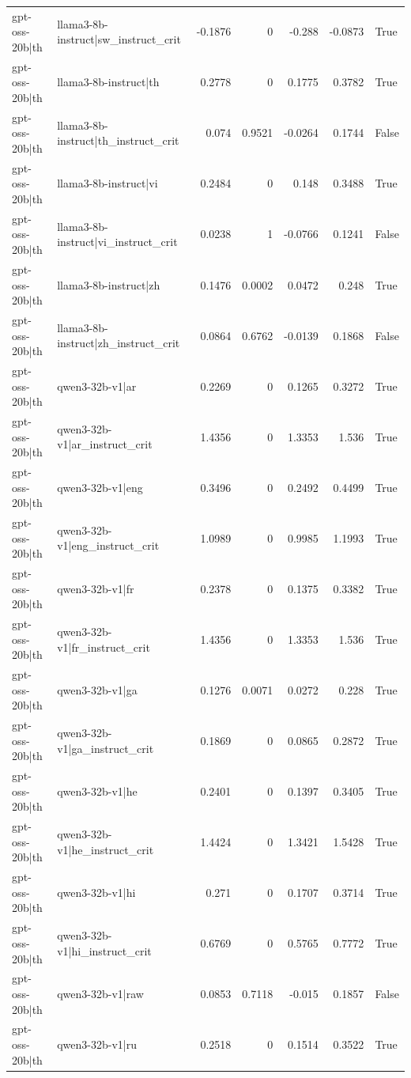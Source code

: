 \begin{table}
\begin{tabular}{l l r r r r l}
gpt-oss-20b|th & llama3-8b-instruct|sw_instruct_crit & -0.1876 & 0 & -0.288 & -0.0873 & True \\
gpt-oss-20b|th & llama3-8b-instruct|th & 0.2778 & 0 & 0.1775 & 0.3782 & True \\
gpt-oss-20b|th & llama3-8b-instruct|th_instruct_crit & 0.074 & 0.9521 & -0.0264 & 0.1744 & False \\
gpt-oss-20b|th & llama3-8b-instruct|vi & 0.2484 & 0 & 0.148 & 0.3488 & True \\
gpt-oss-20b|th & llama3-8b-instruct|vi_instruct_crit & 0.0238 & 1 & -0.0766 & 0.1241 & False \\
gpt-oss-20b|th & llama3-8b-instruct|zh & 0.1476 & 0.0002 & 0.0472 & 0.248 & True \\
gpt-oss-20b|th & llama3-8b-instruct|zh_instruct_crit & 0.0864 & 0.6762 & -0.0139 & 0.1868 & False \\
gpt-oss-20b|th & qwen3-32b-v1|ar & 0.2269 & 0 & 0.1265 & 0.3272 & True \\
gpt-oss-20b|th & qwen3-32b-v1|ar_instruct_crit & 1.4356 & 0 & 1.3353 & 1.536 & True \\
gpt-oss-20b|th & qwen3-32b-v1|eng & 0.3496 & 0 & 0.2492 & 0.4499 & True \\
gpt-oss-20b|th & qwen3-32b-v1|eng_instruct_crit & 1.0989 & 0 & 0.9985 & 1.1993 & True \\
gpt-oss-20b|th & qwen3-32b-v1|fr & 0.2378 & 0 & 0.1375 & 0.3382 & True \\
gpt-oss-20b|th & qwen3-32b-v1|fr_instruct_crit & 1.4356 & 0 & 1.3353 & 1.536 & True \\
gpt-oss-20b|th & qwen3-32b-v1|ga & 0.1276 & 0.0071 & 0.0272 & 0.228 & True \\
gpt-oss-20b|th & qwen3-32b-v1|ga_instruct_crit & 0.1869 & 0 & 0.0865 & 0.2872 & True \\
gpt-oss-20b|th & qwen3-32b-v1|he & 0.2401 & 0 & 0.1397 & 0.3405 & True \\
gpt-oss-20b|th & qwen3-32b-v1|he_instruct_crit & 1.4424 & 0 & 1.3421 & 1.5428 & True \\
gpt-oss-20b|th & qwen3-32b-v1|hi & 0.271 & 0 & 0.1707 & 0.3714 & True \\
gpt-oss-20b|th & qwen3-32b-v1|hi_instruct_crit & 0.6769 & 0 & 0.5765 & 0.7772 & True \\
gpt-oss-20b|th & qwen3-32b-v1|raw & 0.0853 & 0.7118 & -0.015 & 0.1857 & False \\
gpt-oss-20b|th & qwen3-32b-v1|ru & 0.2518 & 0 & 0.1514 & 0.3522 & True \\

\end{tabular}
\end{table}
